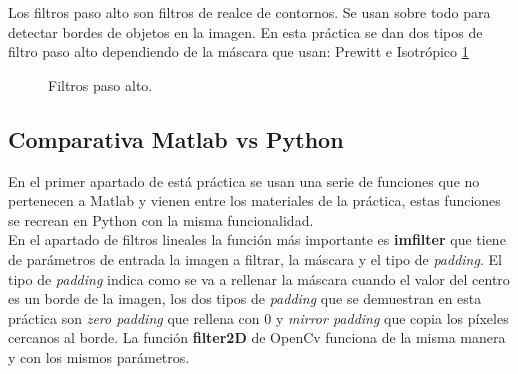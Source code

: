 \documentclass[a4paper,12pt]{report}
\begin{document}
Los filtros paso alto son filtros de realce de contornos. Se usan sobre todo para detectar bordes de objetos en la imagen. En esta práctica se dan dos tipos de filtro paso alto dependiendo de la máscara que usan: Prewitt e Isotrópico \ref{fpa}

\begin{figure}[!tbp]
  \centering
  \hfill
  \caption{Filtros paso alto.}
  \label{fpa}
\end{figure}

\subsection{Comparativa Matlab vs Python}

En el primer apartado de está práctica se usan una serie de funciones que no pertenecen a Matlab y vienen entre los materiales de la práctica, estas funciones se recrean en Python con la misma funcionalidad.\\

En el apartado de filtros lineales la función más importante es \textbf{imfilter} que tiene de parámetros de entrada la imagen a filtrar, la máscara y el tipo de \emph{padding}. El tipo de \emph{padding} indica como se va a rellenar la máscara cuando el valor del centro es un borde de la imagen, los dos tipos de \emph{padding} que se demuestran en esta práctica son \emph{zero padding} que rellena con 0 y \emph{mirror padding} que copia los píxeles cercanos al borde. La función \textbf{filter2D} de OpenCv funciona de la misma manera y con los mismos parámetros.\\
\end{document}
